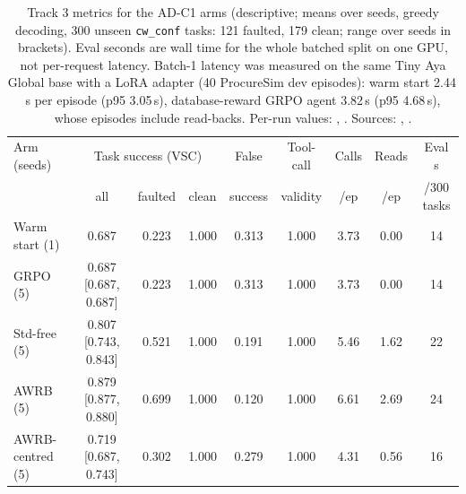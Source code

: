 \begin{table}[t]\centering\small
\begin{tabular}{lcccccccc}\toprule
Arm (seeds) & \multicolumn{3}{c}{Task success (VSC)} & False & Tool-call & Calls & Reads & Eval s \\
 & all & faulted & clean & success & validity & /ep & /ep & /300 tasks \\\midrule
Warm start (1) & 0.687 & 0.223 & 1.000 & 0.313 & 1.000 & 3.73 & 0.00 & 14 \\
GRPO (5) & 0.687 {\scriptsize [0.687, 0.687]} & 0.223 & 1.000 & 0.313 & 1.000 & 3.73 & 0.00 & 14 \\
Std-free (5) & 0.807 {\scriptsize [0.743, 0.843]} & 0.521 & 1.000 & 0.191 & 1.000 & 5.46 & 1.62 & 22 \\
AWRB (5) & 0.879 {\scriptsize [0.877, 0.880]} & 0.699 & 1.000 & 0.120 & 1.000 & 6.61 & 2.69 & 24 \\
AWRB-centred (5) & 0.719 {\scriptsize [0.687, 0.743]} & 0.302 & 1.000 & 0.279 & 1.000 & 4.31 & 0.56 & 16 \\
\bottomrule\end{tabular}
\caption{Track 3 metrics for the AD-C1 arms (descriptive; means over seeds, greedy decoding, 300 unseen \texttt{cw\_conf} tasks: 121 faulted, 179 clean; range over seeds in brackets). Eval seconds are wall time for the whole batched split on one GPU, not per-request latency. Batch-1 latency was measured on the same Tiny Aya Global base with a LoRA adapter (40 ProcureSim dev episodes): warm start 2.44\,s per episode (p95 3.05\,s), database-reward GRPO agent 3.82\,s (p95 4.68\,s), whose episodes include read-backs. Per-run values: , . Sources: , .}\label{tab:track3}
\end{table}
